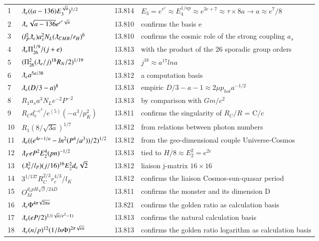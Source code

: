 \documentclass[a4paper,9pt]{article}
\begin{document}
\begin{appendix}
\begin{table}
\begin{tabular}{llll}
   1 & $\lambdabar_{e} ((a-136)E_3^{\sqrt a})^{1/2}$ & 13.814 & $E_3 = e^{e^e} \approx E_4^{1/ap} \approx e^{3e+7}\approx \tau \times 8a \rightarrow a\approx e^7/8$ \\
   2 & $ \lambdabar_{e} \sqrt{a -136} e^{e^e \sqrt a}$ & 13.810 & confirms the basis e \\
   3 & $(l_P^2 \lambdabar_{e})a_s^2 N_L (\lambdabar_{CMB}/r_H)^6$ & 13.810 & confirms the cosmic role of the strong coupling $a_s$ \\
   4 & $\lambdabar_{e} \Pi_{26}^{1/9}/(j+e)$ & 13.813 & with the product of the 26 sporadic group orders\\
   5 & $(\Pi_{26}^2(\lambdabar_e/j)^{18}R_N/2)^{1/19}$ & 13.813 & $j^{18} \approx a^{17} lna$\\
   6 & $\lambdabar_{e} a^{5a/38}$ & 13.812 & a computation basis\\
   7 & $\lambdabar_{e} (D/3 - a)^8$ & 13.813 & empiric $D/3 -a -1 \approx 2\mu p_{hol}a^{-1/2}$\\ 
   8 & $R_1 a_s a^3 N_L e^{-2}P^{-2}$ & 13.813 & by comparison with $Gm/c^2$\\
   9 & $R_C d_e^{-e^3}/e^{(5)}(-a^3/p_K^2)$ & 13.811 & confirms the singularity of $R_C/R$ = C/c\\
  10 & $R_1 (8/\sqrt{3a})^{1/7}$ & 13.812 & from relations between photon numbers \\
   11 & $\lambdabar_{e} ((e^{4e-1/a} - ln^2(P^4/a^3))/2)^{1/2}$ & 13.812 & from the geo-dimensional couple Universe-Cosmos\\
   12 & $\lambdabar_{F} e P^2E_2^4(pn)^{-1/2}$ & 13.813 &tied to $H/8 \approx E_2^2 = e^{2e}$\\
   13 & $(\lambdabar_{e}^2/l_P) (j/16)^{16}E_2^2 d_e \sqrt 2$ & 13.812 & liaison j-matrix $16 \times 16$\\
   14 & $3^{1/137} R_{C}^{2/3} r_e^{4/3} /l_K$ & 13.812 & confirms the liaison Cosmos-sun-quasar period\\
   15 & $O_M^{d_e pH\sqrt\beta / 24D}$ & 13.811 & confirms the monster and its dimension D\\
   16 & $\lambdabar_{e} \Phi ^{4\pi\sqrt{2\pi a}} $ & 13.821 & confirms the golden ratio as calculation basis\\
   17 & $\lambdabar_{e} (eP/2)^{1/(\sqrt a/e^2 - 1)} $ & 13.813 & confirms the natural calculation basis\\
   18 & $\lambdabar_{e} (n/p)^{12} (1/ln{\Phi}) ^{2\pi\sqrt{e a}} $ & 13.813 & confirms the golden ratio logarithm as calculation basis\\

\end{tabular}
\end{table}
\end{appendix}
\end{document}
